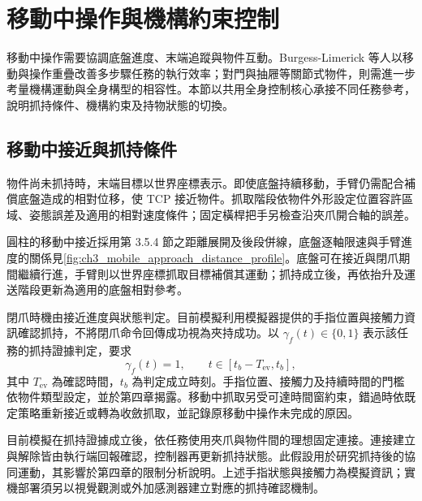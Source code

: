 
\section{移動中操作與機構約束控制}
\label{sec:mobile_constrained_operation}

移動中操作需要協調底盤進度、末端追蹤與物件互動。Burgess-Limerick 等人\cite{burgess2023motm}以移動與操作重疊改善多步驟任務的執行效率；對門與抽屜等關節式物件，則需進一步考量機構運動與全身構型的相容性\cite{mittal2022articulated}。本節以共用全身控制核心承接不同任務參考，說明抓持條件、機構約束及持物狀態的切換。


\subsection{移動中接近與抓持條件}
\label{subsec:moving_approach_grasp}

物件尚未抓持時，末端目標以世界座標表示。即使底盤持續移動，手臂仍需配合補償底盤造成的相對位移，使 TCP 接近物件。抓取階段依物件外形設定位置容許區域、姿態誤差及適用的相對速度條件；固定橫桿把手另檢查沿夾爪開合軸的誤差。

圓柱的移動中接近採用第 3.5.4 節之距離展開及後段併線，底盤逐軸限速與手臂進度的關係見\cref{fig:ch3_mobile_approach_distance_profile}。底盤可在接近與閉爪期間繼續行進，手臂則以世界座標抓取目標補償其運動；抓持成立後，再依抬升及運送階段更新為適用的底盤相對參考。

閉爪時機由接近進度與狀態判定。目前模擬利用模擬器提供的手指位置與接觸力資訊確認抓持，不將閉爪命令回傳成功視為夾持成功。以 $\gamma_f(t)\in\{0,1\}$ 表示該任務的抓持證據判定，要求
\begin{equation}
    \gamma_f(t)=1,
    \qquad
    t\in[t_b-T_{\mathrm{ev}},t_b],
    \label{eq:ch3_grasp_evidence_duration}
\end{equation}
其中 $T_{\mathrm{ev}}$ 為確認時間，$t_b$ 為判定成立時刻。手指位置、接觸力及持續時間的門檻依物件類型設定，並於第四章揭露。移動中抓取另受可達時間窗約束，錯過時依既定策略重新接近或轉為收斂抓取，並記錄原移動中操作未完成的原因。

目前模擬在抓持證據成立後，依任務使用夾爪與物件間的理想固定連接。連接建立與解除皆由執行端回報確認，控制器再更新抓持狀態。此假設用於研究抓持後的協同運動，其影響於第四章的限制分析說明。上述手指狀態與接觸力為模擬資訊；實機部署須另以視覺觀測或外加感測器建立對應的抓持確認機制。

